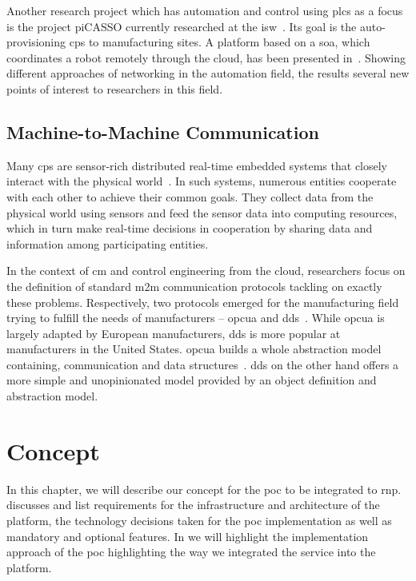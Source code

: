 \documentclass[
a4paper,
twoside,
headsepline,
cleardoublepage=empty,
parskip=half,
draft=false
]{scrbook}
\begin{document}
			Another research project which has automation and control using \gls{plc}s as a focus is the project piCASSO currently researched at the \gls{isw}~\cite{kretschmer2016communication}.
			Its goal is the auto-provisioning \gls{cps} to manufacturing sites.
			A platform based on a \gls{soa}, which coordinates a robot remotely through the cloud, has been presented in~\cite{kretschmer2016communication}. 
			Showing different approaches of networking in the automation field, the results several new points of interest to researchers in this field.

		\section{Machine-to-Machine Communication}\label{sec:machine_to_machine_communication}
			
			Many \gls{cps} are sensor-rich distributed real-time embedded systems that closely interact with the physical world~\cite{kang2012rdds}. 
			In such systems, numerous entities cooperate with each other to achieve their common goals. 
			They collect data from the physical world using sensors and feed the sensor data into computing resources, which in turn make real-time decisions in cooperation by sharing data and information among participating entities.
			
			In the context of \gls{cm} and control engineering from the cloud, researchers focus on the definition of standard \gls{m2m} communication protocols tackling on exactly these problems.
			Respectively, two protocols emerged for the manufacturing field trying to fulfill the needs of manufacturers -- \gls{opcua} and \gls{dds}~\cite{jazdi2014cyber}.
			While \gls{opcua} is largely adapted by European manufacturers, \gls{dds} is more popular at manufacturers in the United States.
			\gls{opcua} builds a whole abstraction model containing, communication and data structures~\cite{candido2010soa}.
			\gls{dds} on the other hand offers a more simple and unopinionated model provided by an object definition and abstraction model.

	\chapter{Concept} \label{ch:concept}

		In this chapter, we will describe our concept for the \gls{poc} to be integrated to \gls{rnp}.
		 discusses and list requirements for the infrastructure and architecture of the platform, the technology decisions taken for the \gls{poc} implementation as well as mandatory and optional features. In  we will highlight the implementation approach of the \gls{poc} highlighting the way we integrated the service into the platform.
\end{document}
